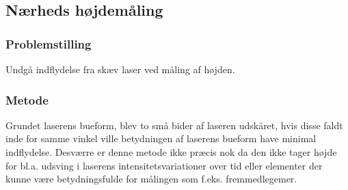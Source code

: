 \subsection{Nærheds højdemåling}
\subsubsection{Problemstilling}
Undgå indflydelse fra skæv laser ved måling af højden.

\subsubsection{Metode}
Grundet laserens bueform, blev to små bider af laseren udskåret, hvis disse faldt inde for samme vinkel ville betydningen af laserens bueform have minimal indflydelse. Desværre er denne metode ikke præcis nok da den ikke tager højde for bl.a. udsving i laserens intensitetsvariationer over tid eller elementer der kunne være betydningsfulde for målingen som f.eks. fremmedlegemer.

